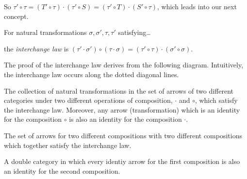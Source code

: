 \begin{figure}[H]
  \centering
  
\end{figure}

\noindent So $\tau' \circ \tau = (T' \circ \tau) \cdot (\tau' \circ S) = (\tau' \circ T) \cdot (S' \circ \tau)$, which leads into our next concept.

\label{interchangelaw}
For natural transformations $\sigma,\sigma',\tau,\tau'$ satisfying\dots

\begin{figure}[H]
  \centering
  
\end{figure}

\noindent the \emph{interchange law} is $(\tau' \cdot \sigma') \circ (\tau \cdot \sigma)=(\tau' \circ \tau)\cdot(\sigma' \circ \sigma).$ \newline

\noindent The proof of the interchange law derives from the following diagram. Intuitively, the interchange law occurs along the dotted diagonal lines.

\begin{figure}[H]
  \centering
  
\end{figure}

\begin{theorem}
The collection of natural transformations in the set of arrows of two different categories under two different operations of composition, $\cdot$ and $\circ$, which satisfy the interchange
law. Moreover, any arrow (transformation) which is an identity for the composition $\circ$ is also an identity for the composition $\cdot$.
\end{theorem}

\label{doublecategory}
The set of arrows for two different compositions with two different compositions which together satisfy the interchange law.

\label{twocategories}
A double category in which every identiy arrow for the first composition is also an identity for the second composition.